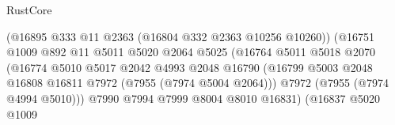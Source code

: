 \begin{lexlean}{RustCore}
\begin{coremodule}
                                                  (@16895
                                                    @333
                                                    @11
                                                    @2363
                                                    (@16804 @332 @2363 @10256 @10260))
                                                  (@16751
                                                    @1009
                                                    @892
                                                    @11
                                                    @5011
                                                    @5020
                                                    @2064
                                                    @5025
                                                    (@16764
                                                      @5011
                                                      @5018
                                                      @2070
                                                      (@16774
                                                        @5010
                                                        @5017
                                                        @2042
                                                        @4993
                                                        @2048
                                                        @16790
                                                        (@16799
                                                          @5003
                                                          @2048
                                                          @16808
                                                          @16811
                                                          @7972
                                                          (@7955 (@7974 @5004 @2064)))
                                                        @7972
                                                        (@7955 (@7974 @4994 @5010)))
                                                      @7990
                                                      @7994
                                                      @7999
                                                      @8004
                                                      @8010
                                                      @16831)
                                                    (@16837
                                                      @5020
                                                      @1009

\end{coremodule}
\end{lexlean}
